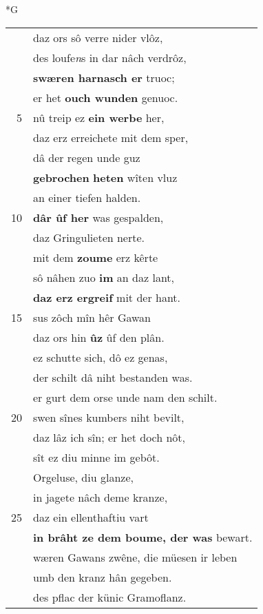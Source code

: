 \documentclass[8pt,a4paper,notitlepage]{article}
\begin{document}
\begin{table}[ht]
\begin{minipage}[t]{0.5\linewidth}
\small
\begin{center}*G
\end{center}
\begin{tabular}{rl}
 & daz ors sô verre nider vlôz,\\ 
 & des loufe\textit{n}s in dar nâch verdrôz,\\ 
 & \textbf{swæren harnasch er} truoc;\\ 
 & er het \textbf{ouch wunden} genuoc.\\ 
5 & nû treip ez \textbf{ein werbe} her,\\ 
 & daz erz erreichete mit dem sper,\\ 
 & dâ der regen unde guz\\ 
 & \textbf{gebrochen} \textbf{heten} wîten vluz\\ 
 & an einer tiefen halden.\\ 
10 & \textbf{dâr ûf her} was gespalden,\\ 
 & daz Gringulieten nerte.\\ 
 & mit dem \textbf{zoume} erz kêrte\\ 
 & sô nâhen zuo \textbf{im} an daz lant,\\ 
 & \textbf{daz erz ergreif} mit der hant.\\ 
15 & sus zôch mîn hêr Gawan\\ 
 & daz ors hin \textbf{ûz} ûf den plân.\\ 
 & ez schutte sich, dô ez genas,\\ 
 & der schilt dâ niht bestanden was.\\ 
 & er gurt dem orse unde nam den schilt.\\ 
20 & swen sînes kumbers niht bevilt,\\ 
 & daz lâz ich sîn; er het doch nôt,\\ 
 & sît ez diu minne im gebôt.\\ 
 & Orgeluse, diu glanze,\\ 
 & in jagete nâch deme kranze,\\ 
25 & daz ein ellenthaftiu vart\\ 
 & \textbf{in brâht ze dem boume, der was} bewart.\\ 
 & wæren Gawans zwêne, die müesen ir leben\\ 
 & umb den kranz hân gegeben.\\ 
 & des pflac der künic Gramoflanz.\\ 

\end{tabular}
\end{minipage}
\end{table}
\end{document}

